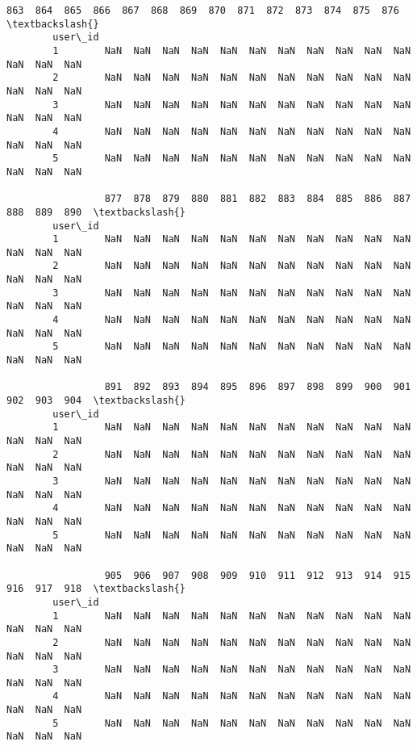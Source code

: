 \documentclass[11pt]{article}
\begin{document}
\begin{Verbatim}[commandchars=\\\{\}]
                 863  864  865  866  867  868  869  870  871  872  873  874  875  876  \textbackslash{}
        user\_id                                                                         
        1        NaN  NaN  NaN  NaN  NaN  NaN  NaN  NaN  NaN  NaN  NaN  NaN  NaN  NaN   
        2        NaN  NaN  NaN  NaN  NaN  NaN  NaN  NaN  NaN  NaN  NaN  NaN  NaN  NaN   
        3        NaN  NaN  NaN  NaN  NaN  NaN  NaN  NaN  NaN  NaN  NaN  NaN  NaN  NaN   
        4        NaN  NaN  NaN  NaN  NaN  NaN  NaN  NaN  NaN  NaN  NaN  NaN  NaN  NaN   
        5        NaN  NaN  NaN  NaN  NaN  NaN  NaN  NaN  NaN  NaN  NaN  NaN  NaN  NaN   
        
                 877  878  879  880  881  882  883  884  885  886  887  888  889  890  \textbackslash{}
        user\_id                                                                         
        1        NaN  NaN  NaN  NaN  NaN  NaN  NaN  NaN  NaN  NaN  NaN  NaN  NaN  NaN   
        2        NaN  NaN  NaN  NaN  NaN  NaN  NaN  NaN  NaN  NaN  NaN  NaN  NaN  NaN   
        3        NaN  NaN  NaN  NaN  NaN  NaN  NaN  NaN  NaN  NaN  NaN  NaN  NaN  NaN   
        4        NaN  NaN  NaN  NaN  NaN  NaN  NaN  NaN  NaN  NaN  NaN  NaN  NaN  NaN   
        5        NaN  NaN  NaN  NaN  NaN  NaN  NaN  NaN  NaN  NaN  NaN  NaN  NaN  NaN   
        
                 891  892  893  894  895  896  897  898  899  900  901  902  903  904  \textbackslash{}
        user\_id                                                                         
        1        NaN  NaN  NaN  NaN  NaN  NaN  NaN  NaN  NaN  NaN  NaN  NaN  NaN  NaN   
        2        NaN  NaN  NaN  NaN  NaN  NaN  NaN  NaN  NaN  NaN  NaN  NaN  NaN  NaN   
        3        NaN  NaN  NaN  NaN  NaN  NaN  NaN  NaN  NaN  NaN  NaN  NaN  NaN  NaN   
        4        NaN  NaN  NaN  NaN  NaN  NaN  NaN  NaN  NaN  NaN  NaN  NaN  NaN  NaN   
        5        NaN  NaN  NaN  NaN  NaN  NaN  NaN  NaN  NaN  NaN  NaN  NaN  NaN  NaN   
        
                 905  906  907  908  909  910  911  912  913  914  915  916  917  918  \textbackslash{}
        user\_id                                                                         
        1        NaN  NaN  NaN  NaN  NaN  NaN  NaN  NaN  NaN  NaN  NaN  NaN  NaN  NaN   
        2        NaN  NaN  NaN  NaN  NaN  NaN  NaN  NaN  NaN  NaN  NaN  NaN  NaN  NaN   
        3        NaN  NaN  NaN  NaN  NaN  NaN  NaN  NaN  NaN  NaN  NaN  NaN  NaN  NaN   
        4        NaN  NaN  NaN  NaN  NaN  NaN  NaN  NaN  NaN  NaN  NaN  NaN  NaN  NaN   
        5        NaN  NaN  NaN  NaN  NaN  NaN  NaN  NaN  NaN  NaN  NaN  NaN  NaN  NaN   
        

\end{Verbatim}
\end{document}
